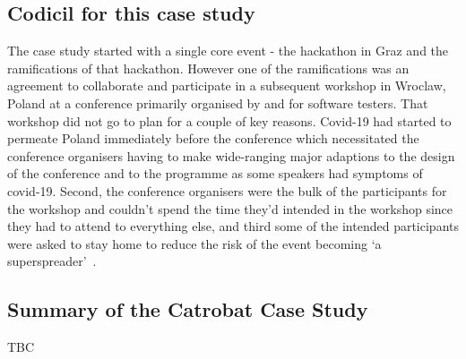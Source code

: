 \subsection{Codicil for this case study}
The case study started with a single core event - the hackathon in Graz and the ramifications of that hackathon. However one of the ramifications was an agreement to collaborate and participate in a subsequent workshop in Wroclaw, Poland at a conference primarily organised by and for software testers. That workshop did not go to plan for a couple of key reasons. Covid-19 had started to permeate Poland immediately before the conference which necessitated the conference organisers having to make wide-ranging major adaptions to the design of the conference and to the programme as some speakers had symptoms of covid-19. Second, the conference organisers were the bulk of the participants for the workshop and couldn't spend the time they'd intended in the workshop since they had to attend to everything else, and third some of the intended participants were asked to stay home to reduce the risk of the event becoming `a superspreader'~\citep{cave2020covid}.

\subsection{Summary of the Catrobat Case Study}
TBC
